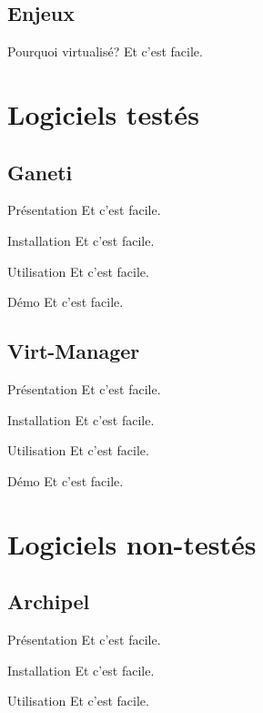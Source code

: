 \documentclass{beamer}
\begin{document}
\subsection{Enjeux}
\begin{frame}{Pourquoi virtualisé?}
  Et c'est facile.
\end{frame}

\section{Logiciels testés}
\subsection{Ganeti}
\begin{frame}{Présentation}
  Et c'est facile.
\end{frame}
\begin{frame}{Installation}
  Et c'est facile.
\end{frame}
\begin{frame}{Utilisation}
  Et c'est facile.
\end{frame}
\begin{frame}{Démo}
  Et c'est facile.
\end{frame}

\subsection{Virt-Manager}
\begin{frame}{Présentation}
  Et c'est facile.
\end{frame}
\begin{frame}{Installation}
  Et c'est facile.
\end{frame}
\begin{frame}{Utilisation}
  Et c'est facile.
\end{frame}
\begin{frame}{Démo}
  Et c'est facile.
\end{frame}

\section{Logiciels non-testés}

\subsection{Archipel}
\begin{frame}{Présentation}
  Et c'est facile.
\end{frame}
\begin{frame}{Installation}
  Et c'est facile.
\end{frame}
\begin{frame}{Utilisation}
  Et c'est facile.
\end{frame}
\end{document}
